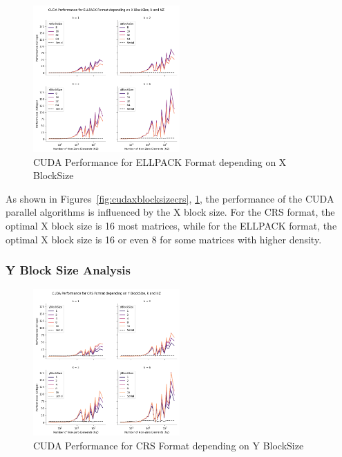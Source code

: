 \documentclass[12pt,oneside]{book} %
\begin{document}
\begin{figure}[H]
    \centering
    \includegraphics[width=0.5\textwidth]{../results/images/CUDA_xBlockSize_ELLPACK.png}
    \caption{CUDA Performance for ELLPACK Format depending on X BlockSize}
    \label{fig:cudaxblocksizeellpack}
\end{figure}

As shown in Figures~\ref{fig:cudaxblocksizecrs},
\ref{fig:cudaxblocksizeellpack}, the performance of the CUDA parallel
algorithms is influenced by the X block size. For the CRS format, the optimal X
block size is 16 most matrices, while for the ELLPACK format, the optimal X
block size is 16 or even 8 for some matrices with higher density.

\subsubsection{Y Block Size Analysis}

\begin{figure}[H]
    \centering
    \includegraphics[width=0.5\textwidth]{../results/images/CUDA_yBlockSize_CRS.png}
    \caption{CUDA Performance for CRS Format depending on Y BlockSize}
    \label{fig:cudayblocksizecrs}
\end{figure}
\end{document}
